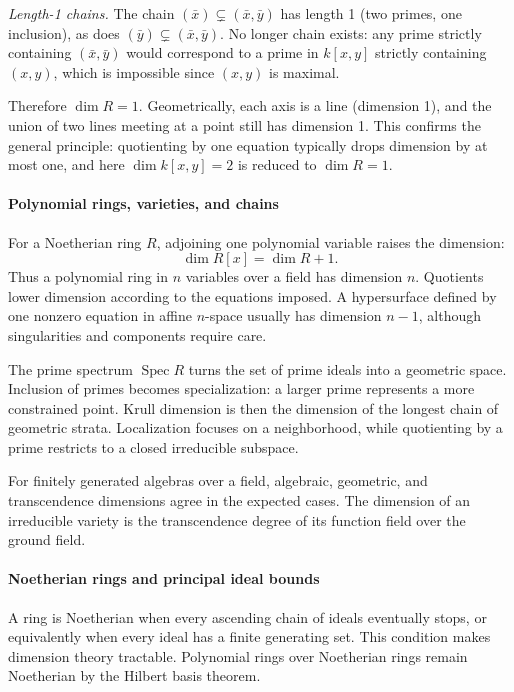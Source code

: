 \noindent\emph{Length-1 chains.} The chain $(\bar x)\subsetneq(\bar x,\bar y)$ has length 1 (two primes, one inclusion), as does $(\bar y)\subsetneq(\bar x,\bar y)$. No longer chain exists: any prime strictly containing $(\bar x,\bar y)$ would correspond to a prime in $k[x,y]$ strictly containing $(x,y)$, which is impossible since $(x,y)$ is maximal.

Therefore $\dim R=1$. Geometrically, each axis is a line (dimension 1), and the union of two lines meeting at a point still has dimension 1. This confirms the general principle: quotienting by one equation typically drops dimension by at most one, and here $\dim k[x,y]=2$ is reduced to $\dim R=1$.

\paragraph{Polynomial rings, varieties, and chains}

For a Noetherian ring $R$, adjoining one polynomial variable raises the dimension:
\[
 \dim R[x]=\dim R+1.
\]
Thus a polynomial ring in $n$ variables over a field has dimension $n$. Quotients lower dimension according to the equations imposed. A hypersurface defined by one nonzero equation in affine $n$-space usually has dimension $n-1$, although singularities and components require care.

The prime spectrum $\operatorname{Spec}R$ turns the set of prime ideals into a geometric space. Inclusion of primes becomes specialization: a larger prime represents a more constrained point. Krull dimension is then the dimension of the longest chain of geometric strata. Localization focuses on a neighborhood, while quotienting by a prime restricts to a closed irreducible subspace.

For finitely generated algebras over a field, algebraic, geometric, and transcendence dimensions agree in the expected cases. The dimension of an irreducible variety is the transcendence degree of its function field over the ground field. \cite{dimension_theory_ref1,dimension_theory_ref3}

\paragraph{Noetherian rings and principal ideal bounds}

A ring is Noetherian when every ascending chain of ideals eventually stops, or equivalently when every ideal has a finite generating set. This condition makes dimension theory tractable. Polynomial rings over Noetherian rings remain Noetherian by the Hilbert basis theorem.

